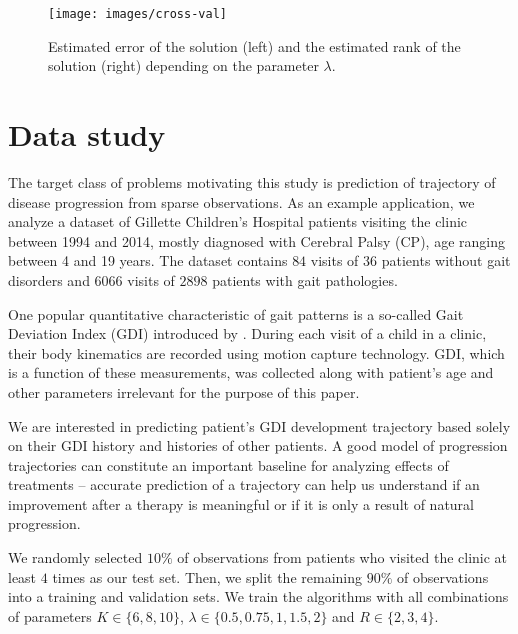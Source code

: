 \documentclass[preprint]{imsart}
\numberwithin{equation}{section}
\theoremstyle{plain}
\begin{document}
\begin{figure}[h!]
  \texttt{[image: images/cross-val]}
  \caption{Estimated error of the solution (left) and the estimated rank of the solution (right) depending on the parameter $\lambda$.}
  \label{fig:estimated-rank}
\end{figure}



\section{Data study}

The target class of problems motivating this study is prediction of trajectory of disease progression from sparse observations. As an example application, we analyze a dataset of Gillette Children's Hospital patients visiting the clinic between 1994 and 2014, mostly diagnosed with Cerebral Palsy (CP), age ranging between 4 and 19 years. The dataset contains $84$ visits of $36$ patients without gait disorders and $6066$ visits of $2898$ patients with gait pathologies. 

One popular quantitative characteristic of gait patterns is a so-called Gait Deviation Index (GDI) introduced by \citet{schwartz2008gait}. During each visit of a child in a clinic, their body kinematics are recorded using motion capture technology. GDI, which is a function of these measurements, was collected along with patient's age and other parameters irrelevant for the purpose of this paper.

We are interested in predicting patient's GDI development trajectory based solely on their GDI history and histories of other patients. A good model of progression trajectories can constitute an important baseline for analyzing effects of treatments -- accurate prediction of a trajectory can help us understand if an improvement after a therapy is meaningful or if it is only a result of natural progression.

We randomly selected $10\%$ of observations from patients who visited the clinic at least $4$ times as our test set. Then, we split the remaining $90\%$ of observations into a training and validation sets. We train the algorithms with all combinations of parameters $K \in \{6,8,10\}$, $\lambda \in \{0.5, 0.75, 1, 1.5, 2\}$ and $R \in \{2,3,4\}$.
\end{document}
